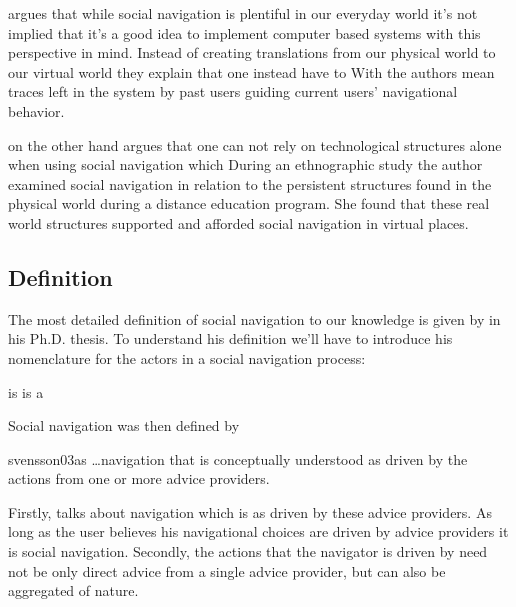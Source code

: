 \citet{svensson05} argues that while social navigation is plentiful in
our everyday world it's not implied that it's a good idea to implement
computer based systems with this perspective in mind. Instead of creating
translations from our physical world to our virtual world
they explain that one instead have to
With  the authors mean traces left in the system by past
users guiding current users' navigational behavior.

\citeauthor{robins02} on the other hand argues that one can not rely on
technological structures alone when using social navigation which
During an ethnographic study the author examined social navigation in relation
to the persistent structures found in the physical world during a distance
education program. She found that these real world structures supported and
afforded social navigation in virtual places.

\subsection{Definition}

The most detailed definition of social navigation to our knowledge is
given by \citet{svensson03} in his Ph.D. thesis. To understand his
definition we'll have to introduce his nomenclature for the actors in a social
navigation process:

\begin{items}
   is 
   is a 
\end{items}

Social navigation was then defined by
\begin{fullquote}[\p{20}]{svensson03}{as}
  \dots navigation that is conceptually understood as driven by the actions
  from one or more advice providers.
\end{fullquote}

Firstly, \citeauthor{svensson03} talks about navigation which is
 as driven by these advice providers. As long as
the user believes his navigational choices are driven by advice providers it
is social navigation. Secondly, the actions that the navigator is driven by
need not be only direct advice from a single advice provider, but can also be
aggregated of nature.

